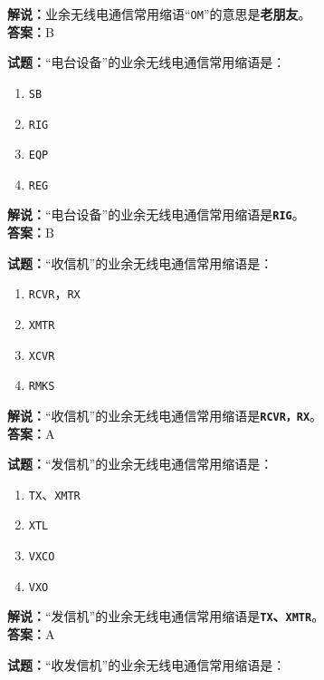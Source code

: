 \documentclass{ctexbook}
\begin{document}
\noindent\textbf{解说：}业余无线电通信常用缩语“\texttt{OM}”的意思是\textbf{老朋友}。\\\noindent\textbf{答案：}B

\bigskip

\noindent\textbf{试题：}“电台设备”的业余无线电通信常用缩语是：

\begin{enumerate}[leftmargin=3em]
  \item \texttt{SB}
  \item \texttt{RIG}
  \item \texttt{EQP}
  \item \texttt{REG}
\end{enumerate}

\noindent\textbf{解说：}“电台设备”的业余无线电通信常用缩语是\texttt{\textbf{RIG}}。\\\noindent\textbf{答案：}B

\bigskip

\noindent\textbf{试题：}“收信机”的业余无线电通信常用缩语是：

\begin{enumerate}[leftmargin=3em]
  \item \texttt{RCVR}，\texttt{RX}
  \item \texttt{XMTR}
  \item \texttt{XCVR}
  \item \texttt{RMKS}
\end{enumerate}

\noindent\textbf{解说：}“收信机”的业余无线电通信常用缩语是\texttt{\textbf{RCVR，RX}}。\\\noindent\textbf{答案：}A

\bigskip

\noindent\textbf{试题：}“发信机”的业余无线电通信常用缩语是：

\begin{enumerate}[leftmargin=3em]
  \item \texttt{TX}、\texttt{XMTR}
  \item \texttt{XTL}
  \item \texttt{VXCO}
  \item \texttt{VXO}
\end{enumerate}

\noindent\textbf{解说：}“发信机”的业余无线电通信常用缩语是\textbf{\texttt{TX}、\texttt{XMTR}}。\\\noindent\textbf{答案：}A

\bigskip

\noindent\textbf{试题：}“收发信机”的业余无线电通信常用缩语是：
\end{document}
